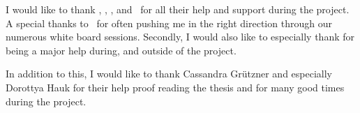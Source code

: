 \vskip 1cm
I would like to thank \FIRSTADVISOR, \SECONDMEMBER, \CHAIRPERSON, and \THIRDMEMBER\ for all their help and support during the project.
A special thanks to \SECONDMEMBER\ for often pushing me in the right direction through our numerous white board sessions.
Secondly, I would also like to especially thank \FIRSTADVISOR for being a major help during, and outside of the project.

In addition to this, I would like to thank Cassandra Gr\"utzner and especially 
Dorottya Hauk for their help proof reading the thesis 
and for many good times during the project.

\vskip 2cm
\noindent \AUTHOR \\
\PLACE \\
\DATE
